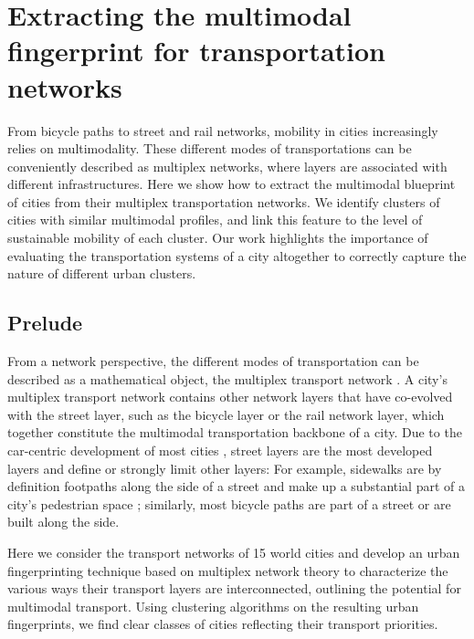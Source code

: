 \chapter{Extracting the multimodal fingerprint for transportation networks}

From bicycle paths to street and rail networks, mobility in cities increasingly relies on multimodality. These different modes of transportations can be conveniently described as multiplex networks, where layers are associated with different infrastructures. Here we show how to extract the multimodal blueprint of cities from their multiplex transportation networks. We identify clusters of cities with similar multimodal profiles, and link this feature to the level of sustainable mobility of each cluster. Our work highlights the importance of evaluating the transportation systems of a city altogether to correctly capture the nature of different urban clusters. 


\section{Prelude}
From a network perspective, the different modes of transportation can be described as a mathematical object, the multiplex transport network \cite{Morris2012,Strano2015,Aleta2017}. A city's multiplex transport network contains other network layers that have co-evolved with the street layer, such as the bicycle layer or the rail network layer, which together constitute the multimodal transportation backbone of a city. Due to the car-centric development of most cities \cite{Jacobs1961}, street layers are the most developed layers \cite{Gossling2016,Szell2018} and define or strongly limit other layers: For example, sidewalks are by definition footpaths along the side of a street and make up a substantial part of a city's pedestrian space \cite{Gossling2016}; similarly, most bicycle paths are part of a street or are built along the side. 

Here we consider the transport networks of 15 world cities and develop an urban fingerprinting technique based on multiplex network theory to characterize the various ways their transport layers are interconnected, outlining the potential for multimodal transport. Using clustering algorithms on the resulting urban fingerprints, we find clear classes of cities reflecting their transport priorities.

